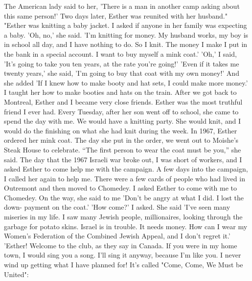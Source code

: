 The American lady said to her, 'There is a 
man in another camp asking about this same person!'
Two days later, 
Esther was reunited with her husband."
"Esther was knitting a baby jacket.
I asked if anyone in 
her family was expecting a baby.
'Oh, no,' she said.
'I'm knitting 
for money.
My husband works, my boy is in school all day, 
and I have nothing to do.
So I knit.
The money I make I put in the 
bank in a special account.
I want to buy myself a mink coat.'
'Oh,' I said, 'It's going to take you ten years, at the rate 
you're going!'
'Even if it takes me twenty years,' she said, 'I'm going to 
buy that coat with my own money!'
And she added 'If I knew how to 
make booty and hat sets, I could make more money.'
I taught her how to make booties and hats on the train.
After we got back to Montreal, Esther and I became very close friends.
Esther was the most truthful friend I ever had.
Every Tuesday, 
after her son went off to school, she came to spend the day with me.
We would have a knitting party.
She would knit, and I would do the 
finishing on what she had knit during the week.
In 1967, Esther ordered her mink coat.
The day she put in the 
order, we went out to Moishe's Steak House to celebrate.
“The first person to wear the coat must be you,” she said.
The day that the 1967 Israeli war broke out, I was short of 
workers, and I asked Esther to come help me with the campaign.
A few days into the campaign, I called her again to help me.
There 
were a few cards of people who had lived in Outremont and then moved 
to Chomedey.
I asked Esther to come with me to Chomedey.
On the 
way, she said to me 'Don't be angry at what I did.
I lost the down-
payment on the coat.'
'How come?'
I asked.
She said 'I've seen many miseries in my life.
I saw many Jewish people, millionaires, looking through the garbage for potato skins.
Israel is in trouble.
It needs money.
How can I wear my 
Women's Federation of the Combined Jewish Appeal, and I don't regret 
it.'
'Esther!
Welcome to the club, as they say in Canada.
If you 
were in my home town, I would sing you a song.
I'll sing it anyway, 
because I'm like you.
I never wind up getting what I have planned
for!
It's called "Come, Come, We Must be United": 

